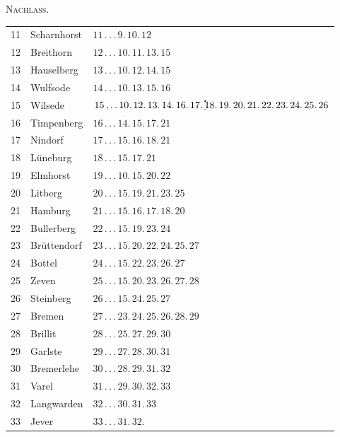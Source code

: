 \clearpage
{}\hfill\textsc{Nachlass.}\hfill\mbox{}\par\bigskip
\noindent
\begin{tabular}{r|l|l}
11&Scharnhorst&$11\,.\,.\,.\,9.\,10.\,12$\\
12&Breithorn&$12\,.\,.\,.\,10.\,11.\,13.\,15$\\
13&Hauselberg&$13\,.\,.\,.\,10.\,12.\,14.\,15$\\
14&Wulfsode&$14\,.\,.\,.\,10.\,13.\,15.\,16$\\
15&Wilsede&$15\,{,}\,.\,.\,10.\,12.\,13.\,14.\,16.\,17.\,\tikz[baseline=0pt,x=1em,y=1em]{\fill (0,.65) rectangle (.12,.79);\draw[line width=.5pt] (0,-.12)..controls(.08,-.15)..(.15,-.12);}\!18.\,19.\,20.\,21.\,22.\,23.\,24.\,25.\,26$\\
16&Timpenberg&$16\,.\,.\,.\,14.\,15.\,17.\,21$\\
17&Nindorf&$17\,.\,.\,.\,15.\,16.\,18.\,21$\\
18&Lüneburg&$18\,.\,.\,.\,15.\,17.\,21$\\
19&Elmhorst&$19\,.\,.\,.\,10.\,15.\,20.\,22$\\
20&Litberg&$20\,.\,.\,.\,15.\,19.\,21.\,23.\,25$\\
21&Hamburg&$21\,.\,.\,.\,15.\,16.\,17.\,18.\,20$\\
22&Bullerberg&$22\,.\,.\,.\,15.\,19.\,23.\,24$\\
23&Brüttendorf&$23\,.\,.\,.\,15.\,20.\,22.\,24.\,25.\,27$\\
24&Bottel&$24\,.\,.\,.\,15.\,22.\,23.\,26.\,27$\\
25&Zeven&$25\,.\,.\,.\,15.\,20.\,23.\,26.\,27.\,28$\\
26&Steinberg&$26\,.\,.\,.\,15.\,24.\,25.\,27$\\
27&Bremen&$27\,.\,.\,.\,23.\,24.\,25.\,26.\,28.\,29$\\
28&Brillit&$28\,.\,.\,.\,25.\,27.\,29.\,30$\\
29&Garlste&$29\,.\,.\,.\,27.\,28.\,30.\,31$\\
30&Bremerlehe&$30\,.\,.\,.\,28.\,29.\,31.\,32$\\
31&Varel&$31\,.\,.\,.\,29.\,30.\,32.\,33$\\
32&Langwarden&$32\,.\,.\,.\,30.\,31.\,33$\\
33&Jever&$33\,.\,.\,.\,31.\,32.$
\end{tabular}


